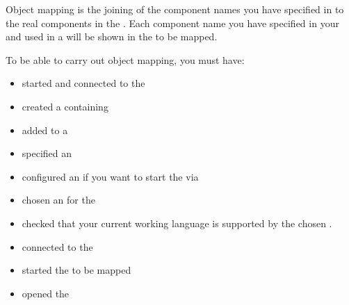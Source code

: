 

Object mapping is the joining of the component names you have specified in \gdsteps{} to the real components in the \gdaut{}. Each component name you have specified in your \gdcases{} and used in a \gdsuite{} will be shown in the \gdomeditor{} to be mapped. 


To be able to carry out object mapping, you must have:

\begin{itemize}
\item started and connected to the \gdagent{} 
\item created a \gdcase{} containing \gdsteps{} 
\item added \gdcases to a \gdsuite{} 
\item specified an \gdaut{}  
\item configured an \gdaut{} if you want to start the \gdaut{} via \app{} 
\item chosen an \gdaut{} for the \gdsuite{} 
\item checked that your current working language is supported by the chosen \gdaut{}. 
\item connected to the \gdagent{} 
\item started the \gdaut{} to be mapped 
\item opened the \gdomeditor{} 
\end{itemize}

